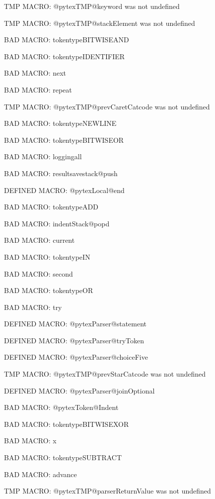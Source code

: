 \ifx\@pytexTMP@keyword\undefined\else TMP MACRO: @pytexTMP@keyword was not undefined
\fi

\ifx\@pytexTMP@stackElement\undefined\else TMP MACRO: @pytexTMP@stackElement was not undefined
\fi

BAD MACRO: tokentypeBITWISEAND

BAD MACRO: tokentypeIDENTIFIER

BAD MACRO: next

BAD MACRO: repeat

\ifx\@pytexTMP@prevCaretCatcode\undefined\else TMP MACRO: @pytexTMP@prevCaretCatcode was not undefined
\fi

BAD MACRO: tokentypeNEWLINE

BAD MACRO: tokentypeBITWISEOR

BAD MACRO: loggingall

BAD MACRO: resultsavestack@push

\ifx\@pytexLocal@end\undefined\else DEFINED MACRO: @pytexLocal@end
\fi

BAD MACRO: tokentypeADD

BAD MACRO: indentStack@popd

BAD MACRO: current

BAD MACRO: tokentypeIN

BAD MACRO: second

BAD MACRO: tokentypeOR

BAD MACRO: try

\ifx\@pytexParser@statement\undefined\else DEFINED MACRO: @pytexParser@statement
\fi

\ifx\@pytexParser@tryToken\undefined\else DEFINED MACRO: @pytexParser@tryToken
\fi

\ifx\@pytexParser@choiceFive\undefined\else DEFINED MACRO: @pytexParser@choiceFive
\fi

\ifx\@pytexTMP@prevStarCatcode\undefined\else TMP MACRO: @pytexTMP@prevStarCatcode was not undefined
\fi

\ifx\@pytexParser@joinOptional\undefined\else DEFINED MACRO: @pytexParser@joinOptional
\fi

BAD MACRO: @pytexToken@Indent

BAD MACRO: tokentypeBITWISEXOR

BAD MACRO: x

BAD MACRO: tokentypeSUBTRACT

BAD MACRO: advance

\ifx\@pytexTMP@parserReturnValue\undefined\else TMP MACRO: @pytexTMP@parserReturnValue was not undefined
\fi


